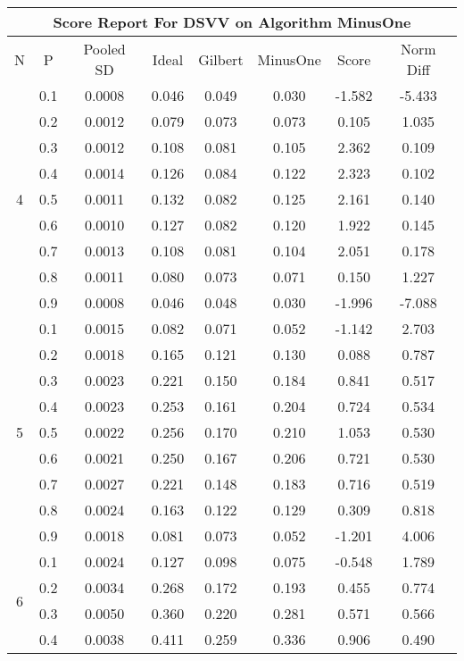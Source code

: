 \documentclass[11pt,a4paper]{report}
\begin{document}
\begin{longtable}{ | c | c || c | c | c | c | c | c | }
\hline
\multicolumn{8}{|c|}{ Score Report For DSVV on Algorithm MinusOne} \\
\hline
N & P & Pooled SD &  Ideal &  Gilbert & MinusOne  & Score & Norm Diff \\
 \hline
 \hline
 \endhead
\multirow{9}{*}{4} & 0.1 & 0.0008 & 0.046 & 0.049 & 0.030 & -1.582 & -5.433 \\
 & 0.2 & 0.0012 & 0.079 & 0.073 & 0.073 & 0.105 & 1.035 \\
 & 0.3 & 0.0012 & 0.108 & 0.081 & 0.105 & 2.362 & 0.109 \\
 & 0.4 & 0.0014 & 0.126 & 0.084 & 0.122 & 2.323 & 0.102 \\
 & 0.5 & 0.0011 & 0.132 & 0.082 & 0.125 & 2.161 & 0.140 \\
 & 0.6 & 0.0010 & 0.127 & 0.082 & 0.120 & 1.922 & 0.145 \\
 & 0.7 & 0.0013 & 0.108 & 0.081 & 0.104 & 2.051 & 0.178 \\
 & 0.8 & 0.0011 & 0.080 & 0.073 & 0.071 & 0.150 & 1.227 \\
 & 0.9 & 0.0008 & 0.046 & 0.048 & 0.030 & -1.996 & -7.088 \\
 \hline
\multirow{9}{*}{5} & 0.1 & 0.0015 & 0.082 & 0.071 & 0.052 & -1.142 & 2.703 \\
 & 0.2 & 0.0018 & 0.165 & 0.121 & 0.130 & 0.088 & 0.787 \\
 & 0.3 & 0.0023 & 0.221 & 0.150 & 0.184 & 0.841 & 0.517 \\
 & 0.4 & 0.0023 & 0.253 & 0.161 & 0.204 & 0.724 & 0.534 \\
 & 0.5 & 0.0022 & 0.256 & 0.170 & 0.210 & 1.053 & 0.530 \\
 & 0.6 & 0.0021 & 0.250 & 0.167 & 0.206 & 0.721 & 0.530 \\
 & 0.7 & 0.0027 & 0.221 & 0.148 & 0.183 & 0.716 & 0.519 \\
 & 0.8 & 0.0024 & 0.163 & 0.122 & 0.129 & 0.309 & 0.818 \\
 & 0.9 & 0.0018 & 0.081 & 0.073 & 0.052 & -1.201 & 4.006 \\
 \hline
\multirow{9}{*}{6} & 0.1 & 0.0024 & 0.127 & 0.098 & 0.075 & -0.548 & 1.789 \\
 & 0.2 & 0.0034 & 0.268 & 0.172 & 0.193 & 0.455 & 0.774 \\
 & 0.3 & 0.0050 & 0.360 & 0.220 & 0.281 & 0.571 & 0.566 \\
 & 0.4 & 0.0038 & 0.411 & 0.259 & 0.336 & 0.906 & 0.490 \\

\end{longtable}
\end{document}
